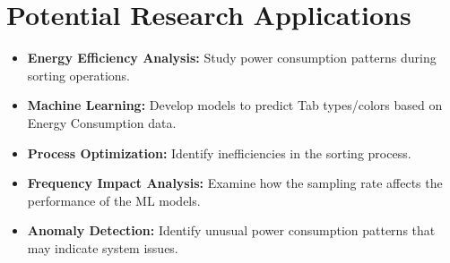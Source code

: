 \documentclass{article}
\begin{document}
\section{Potential Research Applications}

\begin{itemize}
  \item \textbf{Energy Efficiency Analysis:} Study power consumption patterns during sorting operations.
  \item \textbf{Machine Learning:} Develop models to predict Tab types/colors based on Energy Consumption data.
  \item \textbf{Process Optimization:} Identify inefficiencies in the sorting process.
  \item \textbf{Frequency Impact Analysis:} Examine how the sampling rate affects the performance of the ML models.
  \item \textbf{Anomaly Detection:} Identify unusual power consumption patterns that may indicate system issues.
\end{itemize}
\end{document}
